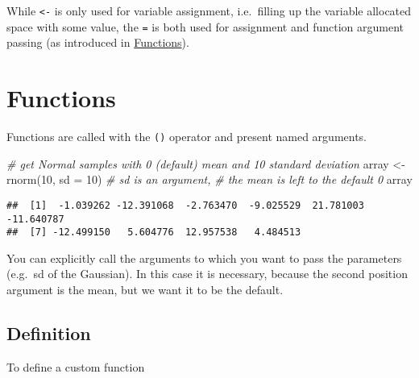 \documentclass[
  oneside]{book}
\newenvironment{Shaded}{\begin{snugshade}}{\end{snugshade}}
\newcommand{\AttributeTok}[1]{\textcolor[rgb]{0.77,0.63,0.00}{#1}}
\newcommand{\CommentTok}[1]{\textcolor[rgb]{0.56,0.35,0.01}{\textit{#1}}}
\newcommand{\DecValTok}[1]{\textcolor[rgb]{0.00,0.00,0.81}{#1}}
\newcommand{\FunctionTok}[1]{\textcolor[rgb]{0.00,0.00,0.00}{#1}}
\newcommand{\NormalTok}[1]{#1}
\newcommand{\OtherTok}[1]{\textcolor[rgb]{0.56,0.35,0.01}{#1}}
\begin{document}
While \texttt{\textless{}-} is only used for variable assignment, i.e.~filling up the variable
allocated space with some value, the \texttt{=} is both used for assignment and
function argument passing (as introduced in \protect\hyperlink{functions}{Functions}).

\hypertarget{functions}{%
\section{Functions}\label{functions}}

Functions are called with the \texttt{()} operator and present named arguments.

\begin{Shaded}
\begin{Highlighting}[]
\CommentTok{\# get Normal samples with 0 (default) mean and 10 standard deviation}
\NormalTok{array }\OtherTok{\textless{}{-}} \FunctionTok{rnorm}\NormalTok{(}\DecValTok{10}\NormalTok{, }\AttributeTok{sd =} \DecValTok{10}\NormalTok{) }\CommentTok{\# sd is an argument,}
                            \CommentTok{\# the mean is left to the default 0}
\NormalTok{array}
\end{Highlighting}
\end{Shaded}

\begin{verbatim}
##  [1]  -1.039262 -12.391068  -2.763470  -9.025529  21.781003 -11.640787
##  [7] -12.499150   5.604776  12.957538   4.484513
\end{verbatim}

You can explicitly call the arguments to which you want to pass the parameters
(e.g.~sd of the Gaussian). In this case it is necessary, because the second
position argument is the mean, but we want it to be the default.

\hypertarget{definition}{%
\subsection{Definition}\label{definition}}

To define a custom function
\end{document}
